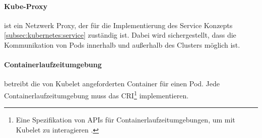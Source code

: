 \paragraph{Kube-Proxy} ist ein Netzwerk Proxy, der für die Implementierung des Service Konzepts \ref{subsec:kubernetes:service}
zuständig ist. 
Dabei wird sichergestellt, dass die Kommunikation von Pods innerhalb und außerhalb des Clusters möglich ist.
\paragraph{Containerlaufzeitumgebung} betreibt die von Kubelet angeforderten Container für einen Pod. 
Jede Containerlaufzeitumgebung muss das 
\ac{CRI}\footnote{Eine Spezifikation von APIs für Containerlaufzeitumgebungen, um mit Kubelet zu interagieren \cite{cri}.} implementieren.
